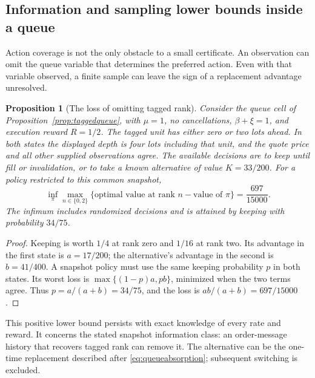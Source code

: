\documentclass[11pt]{article}
\theoremstyle{plain}
\newtheorem{proposition}[theorem]{Proposition}
\theoremstyle{definition}
\theoremstyle{remark}
\begin{document}
\subsection{Information and sampling lower bounds inside a queue}
\label{sec:queuelower}

Action coverage is not the only obstacle to a small certificate.
An observation can omit the queue variable that determines the
preferred action. Even with that variable observed, a finite sample
can leave the sign of a replacement advantage unresolved.

\begin{proposition}[The loss of omitting tagged rank]
\label{prop:ranklower}
Consider the queue cell of Proposition~\ref{prop:taggedqueue}, with
\(\mu=1\), no cancellations, \(\beta+\xi=1\), and execution reward
\(R=1/2\). The tagged unit has either zero or two lots ahead.
In both states the displayed depth is four lots including that unit,
and the quote price and all other supplied observations agree.
The available decisions are to keep until fill or invalidation,
or to take a known alternative of value \(K=33/200\).
For a policy restricted to this common snapshot,
\[
 \inf_{\pi}\max_{n\in\{0,2\}}
 \{\text{optimal value at rank }n-\text{value of }\pi\}
 =\frac{697}{15000}.
\]
The infimum includes randomized decisions and is attained by
keeping with probability \(34/75\).
\end{proposition}
\begin{proof}
Keeping is worth \(1/4\) at rank zero and \(1/16\) at rank two.
Its advantage in the first state is \(a=17/200\); the alternative's
advantage in the second is \(b=41/400\). A snapshot policy must use
the same keeping probability \(p\) in both states. Its worst loss
is \(\max\{(1-p)a,pb\}\), minimized when the two terms agree.
Thus \(p=a/(a+b)=34/75\), and the loss is \(ab/(a+b)=697/15000\).
\end{proof}

This positive lower bound persists with exact knowledge of every
rate and reward. It concerns the stated snapshot information class:
an order-message history that recovers tagged rank can remove it.
The alternative can be the one-time replacement described after
\eqref{eq:queueabsorption}; subsequent switching is excluded.
\end{document}
